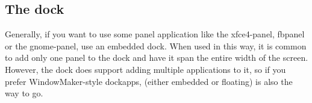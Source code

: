 \subsection{The dock}

Generally, if you want to use some panel application like the xfce4-panel, 
fbpanel or the gnome-panel, use an embedded dock. When used in this way, it is
common to add only one panel to the dock and have it span the entire width of 
the screen. However, the dock does support adding multiple applications to it,
so if you prefer WindowMaker-style dockapps,  (either embedded
or floating) is also the way to go.

